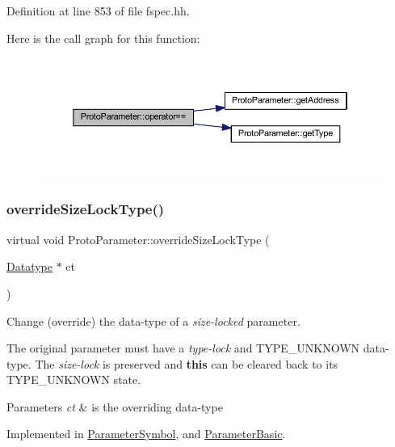 Definition at line 853 of file fspec.\+hh.

Here is the call graph for this function\+:
\nopagebreak
\begin{figure}[H]
\begin{center}
\leavevmode
\includegraphics[width=350pt]{class_proto_parameter_a61ce8ecb7464780b491a8e1ceb7144e8_cgraph}
\end{center}
\end{figure}
\mbox{\label{class_proto_parameter_a05418aa9f8e8fa0c7499b99cd51e24d3}} 
\subsubsection{\texorpdfstring{overrideSizeLockType()}{overrideSizeLockType()}}
{\footnotesize\ttfamily virtual void Proto\+Parameter\+::override\+Size\+Lock\+Type (\begin{DoxyParamCaption}\item[{\mbox{\hyperlink{class_datatype}{Datatype}} $\ast$}]{ct }\end{DoxyParamCaption})\hspace{0.3cm}{\ttfamily [pure virtual]}}



Change (override) the data-\/type of a {\itshape size-\/locked} parameter. 

The original parameter must have a {\itshape type-\/lock} and T\+Y\+P\+E\+\_\+\+U\+N\+K\+N\+O\+WN data-\/type. The {\itshape size-\/lock} is preserved and {\bfseries{this}} can be cleared back to its T\+Y\+P\+E\+\_\+\+U\+N\+K\+N\+O\+WN state. 
\begin{DoxyParams}{Parameters}
{\em ct} & is the overriding data-\/type \\
\hline
\end{DoxyParams}


Implemented in \mbox{\hyperlink{class_parameter_symbol_a248a7be27fb94eeebe4628d623616a6d}{Parameter\+Symbol}}, and \mbox{\hyperlink{class_parameter_basic_a1653c7aaf1e1883127707f4e25d7d564}{Parameter\+Basic}}.

